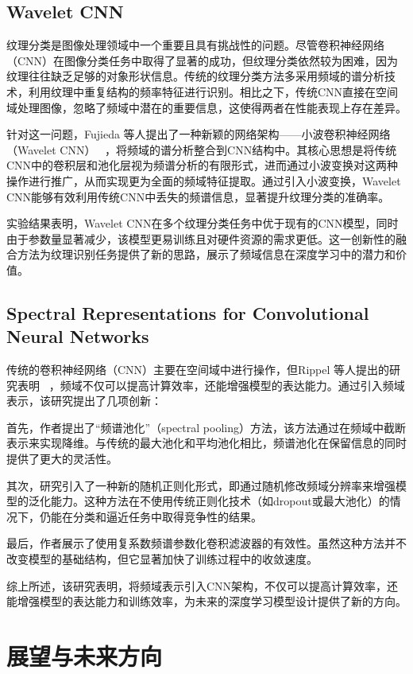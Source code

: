 \documentclass[12pt]{article}
\begin{document}
\subsection{Wavelet CNN}
纹理分类是图像处理领域中一个重要且具有挑战性的问题。尽管卷积神经网络（CNN）在图像分类任务中取得了显著的成功，但纹理分类依然较为困难，因为纹理往往缺乏足够的对象形状信息。传统的纹理分类方法多采用频域的谱分析技术，利用纹理中重复结构的频率特征进行识别。相比之下，传统CNN直接在空间域处理图像，忽略了频域中潜在的重要信息，这使得两者在性能表现上存在差异。

针对这一问题，Fujieda 等人提出了一种新颖的网络架构——小波卷积神经网络（Wavelet CNN） ~\cite{fujieda_wavelet}，将频域的谱分析整合到CNN结构中。其核心思想是将传统CNN中的卷积层和池化层视为频谱分析的有限形式，进而通过小波变换对这两种操作进行推广，从而实现更为全面的频域特征提取。通过引入小波变换，Wavelet CNN能够有效利用传统CNN中丢失的频谱信息，显著提升纹理分类的准确率。

实验结果表明，Wavelet CNN在多个纹理分类任务中优于现有的CNN模型，同时由于参数量显著减少，该模型更易训练且对硬件资源的需求更低。这一创新性的融合方法为纹理识别任务提供了新的思路，展示了频域信息在深度学习中的潜力和价值。

\subsection{Spectral Representations for Convolutional Neural Networks}

传统的卷积神经网络（CNN）主要在空间域中进行操作，但Rippel 等人提出的研究表明 ~\cite{rippel2015spectral}，频域不仅可以提高计算效率，还能增强模型的表达能力。通过引入频域表示，该研究提出了几项创新：

首先，作者提出了“频谱池化”（spectral pooling）方法，该方法通过在频域中截断表示来实现降维。与传统的最大池化和平均池化相比，频谱池化在保留信息的同时提供了更大的灵活性。

其次，研究引入了一种新的随机正则化形式，即通过随机修改频域分辨率来增强模型的泛化能力。这种方法在不使用传统正则化技术（如dropout或最大池化）的情况下，仍能在分类和逼近任务中取得竞争性的结果。

最后，作者展示了使用复系数频谱参数化卷积滤波器的有效性。虽然这种方法并不改变模型的基础结构，但它显著加快了训练过程中的收敛速度。

综上所述，该研究表明，将频域表示引入CNN架构，不仅可以提高计算效率，还能增强模型的表达能力和训练效率，为未来的深度学习模型设计提供了新的方向。

\section{展望与未来方向}
\end{document}
